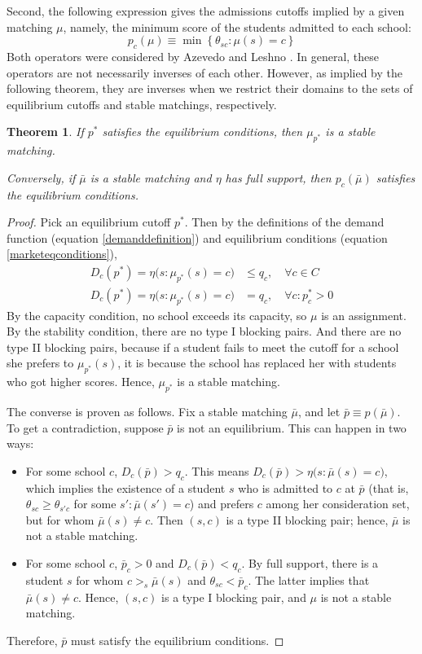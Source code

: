 \documentclass[12pt]{article}
\numberwithin{equation}{subsection}
\newtheorem{theorem}{Theorem}
\theoremstyle{definition}
\begin{document}
Second, the following expression gives the admissions cutoffs implied by a given matching $\mu$, namely, the minimum score of the students admitted to each school:
\[p_c(\mu) \equiv \min \left\{\theta_{sc}: \mu(s) = c\right\}\]
Both operators were considered by Azevedo and Leshno \parencite*{supplydemandfw}. In general, these operators are not necessarily inverses of each other. However, as implied by the following theorem, they are inverses when we restrict their domains to the sets of equilibrium cutoffs and stable matchings, respectively. 

\begin{theorem}If $p^*$ satisfies the equilibrium conditions, then $\mu_{p^*}$ is a stable matching. 

Conversely, if $\bar \mu$ is a stable matching and $\eta$ has full support, then $p_c(\bar \mu)$ satisfies the equilibrium conditions. \end{theorem}

\begin{proof}Pick an equilibrium cutoff $p^*$. Then by the definitions of the demand function (equation \eqref{demanddefinition}) and equilibrium conditions (equation \eqref{marketeqconditions}), 
\begin{align*}
D_c(p^*) = \eta\bigl(s: \mu_{p^*}(s) = c\bigr) &\leq q_c, \quad\forall c \in C \\
D_c(p^*) = \eta\bigl(s: \mu_{p^*}(s) = c\bigr) &= q_c, \quad \forall c: p_c^* > 0 
\end{align*}
By the capacity condition, no school exceeds its capacity, so $\mu$ is an assignment. By the stability condition, there are no type I blocking pairs. And there are no type II blocking pairs, because if a student fails to meet the cutoff for a school she prefers to $\mu_{p^*}(s)$, it is because the school has replaced her with students who got higher scores. Hence, $\mu_{p^*}$ is a stable matching.

The converse is proven as follows. Fix a stable matching $\bar \mu$, and let $\bar p \equiv p(\bar \mu)$. To get a contradiction, suppose $\bar p$ is not an equilibrium. This can happen in two ways:
\begin{itemize}
\item For some school $c$, $D_c( \bar p) > q_c$. This means $D_c( \bar p)  >  \eta\bigl(s: \bar \mu(s) = c\bigr) $, which implies the existence of a student $s$ who is admitted to $c$ at $\bar p$ (that is, $\theta_{sc} \geq \theta_{s'c}$ for some $s': \bar \mu(s') = c$) and prefers $c$ among her consideration set, but for whom $\bar \mu(s) \neq c$. Then $(s, c)$ is a type II blocking pair; hence, $\bar \mu$ is not a stable matching.
\item For some school $c$, $\bar p_c > 0$ and $D_c(\bar p) < q_c$. By full support, there is a student $s$ for whom $c >_s \bar \mu(s)$ and $\theta_{sc} < \bar p_c$. The latter implies that $\bar \mu(s) \neq c$. Hence, $(s, c)$ is a type I blocking pair, and $\mu$ is not a stable matching. 
\end{itemize}
Therefore, $\bar p$ must satisfy the equilibrium conditions.
\end{proof}
\end{document}
